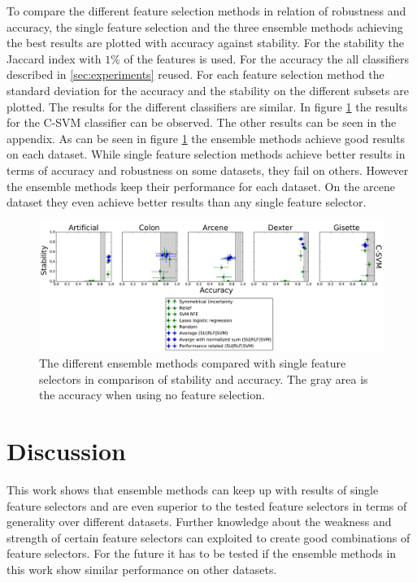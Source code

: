 \documentclass[twoside,11pt]{article}
\begin{document}
To compare the different feature selection methods in relation of robustness and accuracy, the single feature selection and the three ensemble methods achieving the best results are plotted with accuracy against stability. For the stability the Jaccard index with $1\%$ of the features is used. For the accuracy the all classifiers described in \ref{sec:experiments}  reused. For each feature selection method the standard deviation for the accuracy and the stability on the different subsets are plotted. The results for the different classifiers are similar. In figure \ref{fig:boxplot_svm} the results for the C-SVM classifier can be observed. The other results can be seen in the appendix. %
As can be seen in figure \ref{fig:boxplot_svm} the ensemble methods achieve good results on each dataset. While single feature selection methods achieve better results in terms of accuracy and robustness on some datasets, they fail on others. However the ensemble methods keep their performance for each dataset. On the arcene dataset they even achieve better results than any single feature selector.

\begin{figure}[H]
  \centering
    \includegraphics[width=\textwidth]{images/boxplot_svm.pdf}
  \caption{The different ensemble methods compared with single feature selectors in comparison of stability and accuracy.
  The gray area is the accuracy when using no feature selection.}
  \label{fig:boxplot_svm}
\end{figure}

\section{Discussion}
This work shows that ensemble methods can keep up with results of single feature selectors and are even superior to the tested feature selectors in terms of generality over different datasets. Further knowledge about the weakness and strength of certain feature selectors can exploited to create good combinations of feature selectors. For the future it has to be tested if the ensemble methods in this work show similar performance on other datasets.
\end{document}
